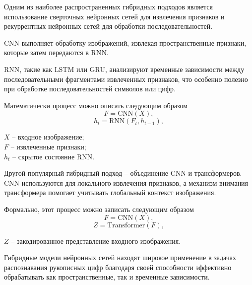 \anonsection{}Одним из наиболее распространенных гибридных подходов является 
использование сверточных нейронных сетей для извлечения признаков и 
рекуррентных нейронных сетей для обработки последовательностей. 

CNN выполняет обработку изображений, извлекая пространственные признаки, 
которые затем передаются в RNN.\@

RNN, такие как LSTM или GRU, анализируют временные зависимости между 
последовательными фрагментами извлеченных признаков, что особенно полезно 
при обработке последовательностей символов или цифр.

Математически процесс можно описать следующим образом
\begin{equation}
    F = \text{CNN}(X),
\end{equation}
\begin{equation}
    h_t = \text{RNN}(F_t, h_{t-1}),
\end{equation}

 $X$ – входное изображение;\\ 
\hphantom{где} $F$ – извлеченные признаки;\\ 
\hphantom{где} $h_t$ – скрытое состояние RNN.\@

\anonsection{}Другой популярный гибридный подход – объединение CNN и 
трансформеров. CNN используются для локального извлечения признаков, а механизм
внимания трансформера помогает учитывать глобальный контекст изображения.

Формально, этот процесс можно записать следующим образом
\begin{equation}
    F = \text{CNN}(X),
\end{equation}
\begin{equation}
    Z = \text{Transformer}(F),
\end{equation}

 $Z$ – закодированное представление входного изображения.

\anonsection{}Гибридные модели нейронных сетей находят широкое применение в 
задачах распознавания рукописных цифр благодаря своей способности эффективно 
обрабатывать как пространственные, так и временные зависимости. 

